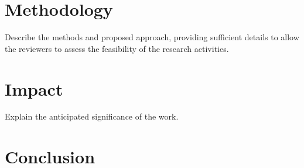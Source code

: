 \documentclass[12pt,english]{nserc-appendix}
\begin{document}
\section{Methodology}

Describe the methods and proposed approach, providing sufficient details to allow the reviewers to assess the feasibility of the research activities.

\blindtext{}

\section{Impact}

Explain the anticipated significance of the work.

\blindtext{}

\section{Conclusion}

\blindtext{}

\newpage
\pagestyle{plain}


\end{document}
